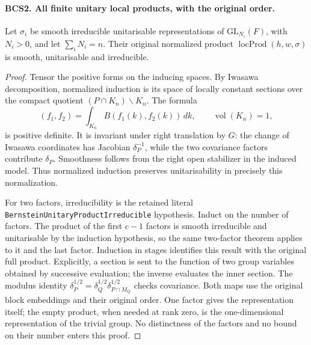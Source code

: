 \documentclass[11pt,a4paper]{article}
\numberwithin{equation}{section}
\theoremstyle{remark}\newtheorem{remark}[theorem]{Remark}
\begin{document}
\paragraph{BCS2. All finite unitary local products, with the original order.}
\label{claim:BCS2}
Let \(\sigma_i\) be smooth irreducible unitarisable representations
of \(\mathrm{GL}_{N_i}(F)\), with \(N_i>0\), and let
\(\sum_iN_i=n\).  Their original normalized product
\(\operatorname{locProd}(h,w,\sigma)\) is smooth, unitarisable and
irreducible.
\begin{proof}
Tensor the positive forms on the inducing spaces.  By Iwasawa
decomposition, normalized induction is its space of locally constant
sections over the compact quotient \((P\cap K_n)\backslash K_n\).
The formula
\[
             (f_1,f_2)=\int_{K_n}B(f_1(k),f_2(k))\,dk,
             \qquad\operatorname{vol}(K_n)=1,
 \tag{BCS.5}
\]
is positive definite.  It is invariant under right translation by
\(G\): the change of Iwasawa coordinates has Jacobian
\(\delta_P^{-1}\), while the two covariance factors contribute
\(\delta_P\).  Smoothness follows from the right open stabilizer
in the induced model.  Thus normalized induction preserves
unitarisability in precisely this normalization.

For two factors, irreducibility is the retained literal
\texttt{Bernstein\allowbreak Unitary\allowbreak Product\allowbreak Irreducible} hypothesis.  Induct on
the number of factors.  The product of the first \(c-1\) factors
is smooth irreducible and unitarisable by the induction hypothesis,
so the same two-factor theorem applies to it and the last factor.
Induction in stages identifies this result with the original full
product.  Explicitly, a section is sent to the function of two group
variables obtained by successive evaluation; the inverse evaluates
the inner section.  The modulus identity
\(\delta_P^{1/2}=\delta_Q^{1/2}\delta_{P\cap M_Q}^{1/2}\)
checks covariance.  Both maps use the original block embeddings and
their original order.  One factor gives the representation itself;
the empty product, when needed at rank zero, is the one-dimensional
representation of the trivial group.  No distinctness of the factors
and no bound on their number enters this proof.
\end{proof}

\end{document}

